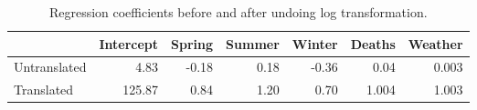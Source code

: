 \begin{table}[h!]
\centering
\begin{tabular}{|l|r|r|r|r|r|r|}
\hline
\rowcolor[HTML]{E7EAF6} 
\textbf{} & \textbf{Intercept} & \textbf{Spring} & \textbf{Summer} & \textbf{Winter} & \textbf{Deaths} & \textbf{Weather} \\ \hline
Untranslated & 4.83 & -0.18 & 0.18 & -0.36 & 0.04 & 0.003 \\ \hline
Translated & 125.87 & 0.84 & 1.20 & 0.70 & 1.004 & 1.003 \\ \hline
\end{tabular}
\caption{Regression coefficients before and after undoing log transformation.}
\end{table}
